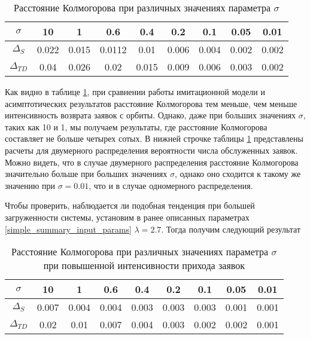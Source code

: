 \begin{table}[h!] 
	\centering
	\caption{Расстояние Колмогорова при различных значениях параметра $\sigma$}
	\label{table_simple_summary}
	\begin{tabular}{| c | c | c | c | c | c | c | c | c |}
		\hline
		$\sigma$ & 10 & 1 & 0.6 & 0.4 & 0.2 & 0.1 & 0.05 & 0.01 \\ 
		\hline
		$\Delta_S$ & 0.022 & 0.015 & 0.0112 & 0.01 & 0.006 & 0.004 & 0.002 & 0.002\\
		\hline
		$\Delta_{TD}$ & 0.04 & 0.026 & 0.02 & 0.015 & 0.009 & 0.006 & 0.003 & 0.002\\
		\hline
	\end{tabular}
\end{table}

Как видно в таблице \ref{table_simple_summary}, при сравнении работы имитационной модели и асимптотических результатов расстояние Колмогорова тем меньше, чем меньше интенсивность возврата заявок с орбиты. Однако, даже при больших значениях $\sigma$, таких как 10 и 1, мы получаем результаты, где расстояние Колмогорова составляет не больше четырех сотых. В нижней строчке таблицы \ref{table_simple_summary} представлены расчеты для двумерного распределения вероятности числа обслуженных заявок. Можно видеть, что в случае двумерного распределения расстояние Колмогорова значительно больше при больших значениях $\sigma$, однако оно сходится к такому же значению при $\sigma = 0.01$, что и в случае одномерного распределения.

Чтобы проверить, наблюдается ли подобная тенденция при большей загруженности системы, установим в ранее описанных параметрах \eqref{simple_summary_input_params} $\lambda = 2.7$. Тогда получим следующий результат

\begin{table}[h!] 
	\centering
	\caption{Расстояние Колмогорова при различных значениях параметра $\sigma$ при повышенной интенсивности прихода заявок}
	\label{table_simple_summary_high_lambda}
	\begin{tabular}{| c | c | c | c | c | c | c | c | c |}
		\hline
		$\sigma$ & 10 & 1 & 0.6 & 0.4 & 0.2 & 0.1 & 0.05 & 0.01 \\ 
		\hline
		$\Delta_S$ & 0.007 & 0.004 & 0.004 & 0.003 & 0.003 & 0.003 & 0.001 & 0.001\\
		\hline
		$\Delta_{TD}$ & 0.02 & 0.01 & 0.007 & 0.004 & 0.003 & 0.002 & 0.002 & 0.001\\
		\hline
	\end{tabular}
\end{table}


